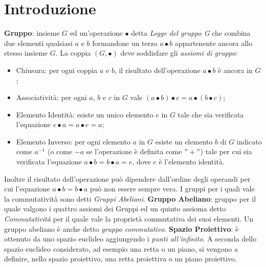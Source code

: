 \documentclass[a4paper,12pt]{tesiinfo}
\begin{document}
\maketitle
\contentspage
\chapter{Introduzione}


\textbf{Gruppo}: insieme $G$ ed un'operazione $\bullet$ detta \textit{Legge del gruppo G} che combina due elementi qualsiasi $a$ e $b$ formandone un terzo $a\bullet b$ appartenente ancora allo stesso insieme $G$. 
La coppia $(G, \bullet)$ deve soddisfare gli \textit{assiomi di gruppo}:
\begin{itemize}
    \item Chiusura: per ogni coppia $a$ e $b$, il risultato dell'operazione $a\bullet b$ \`e ancora in $G$;
    \item Associativit\`a: per ogni $a$, $b$ e $c$ in $G$ vale $\left ( a\bullet b \right ) \bullet c = a \bullet \left ( b \bullet c \right ) $;
    \item Elemento Identit\`a: esiste un unico elemento $e$ in $G$ tale che sia verificata l'equazione $ e \bullet a = a \bullet e = a$;
    \item Elemento Inverso: per ogni elemento $a$ in $G$ esiste un elemento $b$ di $G$ indicato come $a^{-1}$ (o come $-a$ se l'operazione \`e definita come $"+"$) tale per cui sia verificata l'equazione $ a \bullet b = b \bullet a = e$, dove $e$ \`e l'elemento identit\`a.
\end{itemize}
Inoltre il risultato dell'operazione pu\`o dipendere dall'ordine degli operandi per cui l'equazione $ a \bullet b = b \bullet a$ pu\`o non essere sempre vera. I gruppi per i quali vale la commutatività sono detti \textit{Gruppi Abeliani}.
\newline\newline
\textbf{Gruppo Abeliano}: gruppo per il quale valgono i quattro assiomi dei Gruppi ed un quinto assioma detto \textit{Commutativit\`a} per il quale vale la propriet\`a commutativa dei suoi elementi. Un gruppo abeliano \`e anche detto \textit{gruppo commutativo}.
\newline\newline
\textbf{Spazio Proiettivo}: \`e ottenuto da uno spazio euclideo aggiungendo i \textit{punti all'infinito}. A seconda dello spazio euclideo considerato, ad esempio una retta o un piano, si vengono a definire, nello spazio proiettivo, una retta proiettiva o un piano proiettivo. 
\end{document}

